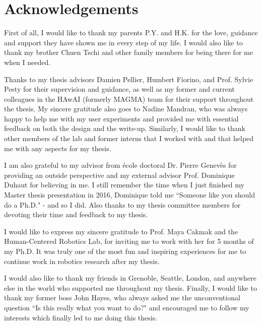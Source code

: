 \chapter*{Acknowledgements}
First of all, I would like to thank my parents P.Y. and H.K. for the love, guidance and support they have shown me in every step of my life.
I would also like to thank my brother Chuen Tschi and other family members for being there for me when I needed.

Thanks to my thesis advisors Damien Pellier, Humbert Fiorino, and Prof. Sylvie Pesty for their supervision and guidance, as well as my former and current colleagues in the HAwAI (formerly MAGMA) team for their support throughout the thesis.
My sincere gratitude also goes to Nadine Mandran, who was always happy to help me with my user experiments and provided me with essential feedback on both the design and the write-up.
Similarly, I would like to thank other members of the lab and former interns that I worked with and that helped me with any aspects for my thesis.

I am also grateful to my advisor from école doctoral Dr. Pierre Genevès for providing an outside perspective and my external advisor Prof. Dominique Duhaut for believing in me.
I still remember the time when I just finished my Master thesis presentation in 2016, Dominique told me ``Someone like you should do a Ph.D." - and so I did.
Also thanks to my thesis committee members for devoting their time and feedback to my thesis.

I would like to express my sincere gratitude to Prof. Maya Cakmak and the Human-Centered Robotics Lab, for inviting me to work with her for 5 months of my Ph.D.
It was truly one of the most fun and inspiring experiences for me to continue work in robotics research after my thesis.

I would also like to thank my friends in Grenoble, Seattle, London, and anywhere else in the world who supported me throughout my thesis.
Finally, I would like to thank my former boss John Hayes, who always asked me the unconventional question ``Is this really what you want to do?" and encouraged me to follow my interests which finally led to me doing this thesis.

